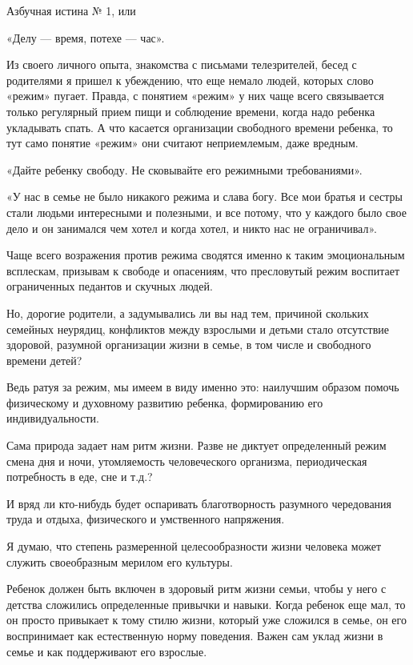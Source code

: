 \documentclass[12pt, a4paper, openany]{book}
\begin{document}
\begin{center}
	Азбучная истина № 1, или 

«Делу — время, потехе — час». 
\end{center}

Из своего личного опыта, знакомства с письмами телезрителей, бесед с родителями я пришел к убеждению, что еще немало людей, которых слово «режим» пугает. Правда, с понятием «режим» у них чаще всего связывается только регулярный прием пищи и соблюдение времени, когда надо ребенка укладывать спать. А что касается организации свободного времени ребенка, то тут само понятие «режим» они считают неприемлемым, даже вредным. 

«Дайте ребенку свободу. Не сковывайте его режимными требованиями». 

«У нас в семье не было никакого режима и слава богу. Все мои братья и сестры стали людьми интересными и полезными, и все потому, что у каждого было свое дело и он занимался чем хотел и когда хотел, и никто нас не ограничивал». 

Чаще всего возражения против режима сводятся именно к таким эмоциональным всплескам, призывам к свободе и опасениям, что пресловутый режим воспитает ограниченных педантов и скучных людей. 

Но, дорогие родители, а задумывались ли вы над тем, причиной скольких семейных неурядиц, конфликтов между взрослыми и детьми стало отсутствие здоровой, разумной организации жизни в семье, в том числе и свободного времени детей? 

Ведь ратуя за режим, мы имеем в виду именно это: наилучшим образом помочь физическому и духовному развитию ребенка, формированию его индивидуальности. 

Сама природа задает нам ритм жизни. Разве не диктует определенный режим смена дня и ночи, утомляемость человеческого организма, периодическая потребность в еде, сне и т.д.? 

И вряд ли кто-нибудь будет оспаривать благотворность разумного чередования труда и отдыха, физического и умственного напряжения. 

Я думаю, что степень размеренной целесообразности жизни человека может служить своеобразным мерилом его культуры. 

Ребенок должен быть включен в здоровый ритм жизни семьи, чтобы у него с детства сложились определенные привычки и навыки. Когда ребенок еще мал, то он просто привыкает к тому стилю жизни, который уже сложился в семье, он его воспринимает как естественную норму поведения. Важен сам уклад жизни в семье и как поддерживают его взрослые. 
\end{document}

